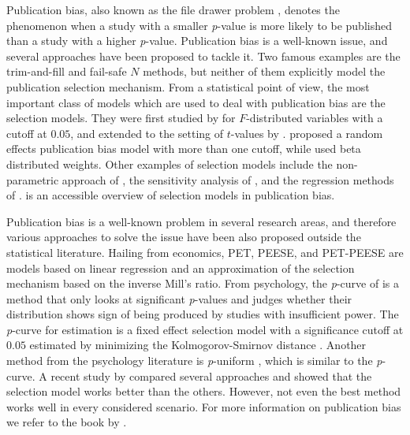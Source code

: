 \documentclass[useAMS,usenatbib,referee]{biom}
\begin{document}
Publication bias, also known as the file drawer problem \citep{Rosenthal1979-pm}, denotes the phenomenon when a study with a smaller \textit{p}-value is more likely to be published than a study with a higher \textit{p}-value. Publication bias is a well-known issue, and several approaches have been proposed to tackle it. Two famous examples are the trim-and-fill \citep{duval2000trim} and fail-safe $N$ \citep{becker2005failsafe} methods, but neither of them explicitly model the publication selection mechanism. From a statistical point of view, the most important class of models which are used to deal with publication bias are the selection models. They were first studied by \citet{hedges1984estimation} for $F$-distributed variables with a cutoff at $0.05$, and extended to the setting of $t$-values by \citet{iyengar1988selection}. \citet{hedges1992modeling} proposed a random effects publication bias model with more than one cutoff, while \citet{citkowicz2017parsimonious} used beta distributed weights. Other examples of selection models include the non-parametric approach of \cite{dear1992approach}, the sensitivity analysis of \cite{CopasShi2000}, and the regression methods of \cite{Vevea1995-on}. \citet{mcshane2016adjusting} is an accessible overview of selection models in publication bias.

Publication bias is a well-known problem in several research areas, and therefore various approaches to solve the issue have been also proposed outside the statistical literature. Hailing from economics, PET, PEESE, and PET-PEESE \citep{stanley2014meta} are models based on linear regression and an approximation of the selection mechanism based on the inverse Mill's ratio. From psychology, the \textit{p}-curve of \citet{simonsohn2014p} is a method that only looks at significant \textit{p}-values and judges whether their distribution shows sign of being produced by studies with insufficient power. The \textit{p}-curve for estimation \citep{simonsohn2014} is a fixed effect selection model with a significance cutoff at $0.05$ estimated by minimizing the Kolmogorov-Smirnov distance \citep{mcshane2016adjusting}. Another method from the psychology literature is \textit{p}-uniform \citep{van2015meta}, which is similar to the \textit{p}-curve. A recent study by \citet{carter2019correcting} compared several approaches and showed that the selection model works better than the others. However, not even the best method works well in every considered scenario. For more information on publication bias we refer to the book by \citet{rothstein2006publication}.
\end{document}
